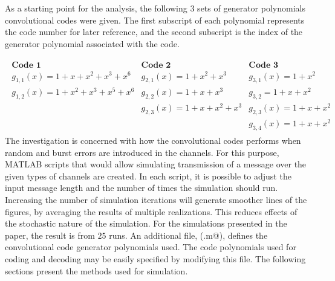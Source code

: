 As a starting point for the analysis, the following 3 sets of generator polynomials convolutional codes were given. The first subscript of each polynomial represents the code number for later reference, and the second subscript is the index of the generator polynomial associated with the code.

\begin{align*}
\begin{matrix}
\textbf{Code 1}&\textbf{Code 2}&\textbf{Code 3}\\
g_{1,1}(x) = 1 + x + x^2 + x^3 + x^6&g_{2,1}(x) = 1 + x^2 + x^3&g_{3,1}(x)=1 + x^2\\
g_{1,2}(x) = 1 + x^2 + x^3 + x^5 + x^6&g_{2,2}(x)=1 + x + x^3&g_{3,2} = 1+x+x^2\\
&g_{2,3}(x) = 1+x+x^2+x^3&g_{2,3}(x)=1+x+x^2\\
&&g_{3,4}(x) = 1+x+x^2
\end{matrix}
\end{align*}
The investigation is concerned with how the convolutional codes performs when random and burst errors are introduced in the channels. For this purpose, MATLAB scripts that would allow simulating transmission of a message over the given types of channels are created.
In each script, it is possible to adjust the input message length and the number of times the simulation should run. Increasing the number of simulation iterations will generate smoother lines of the figures, by averaging the results of multiple realizations. This reduces effects of the stochastic nature of the simulation. For the simulations presented in the paper, the result is from $25$ runs. 
An additional file, (\verb@trellisGenerator.m@), defines the convolutional code generator polynomials used. The code polynomials used for coding and decoding may be easily specified by modifying this file.
The following sections present the methods used for simulation.
